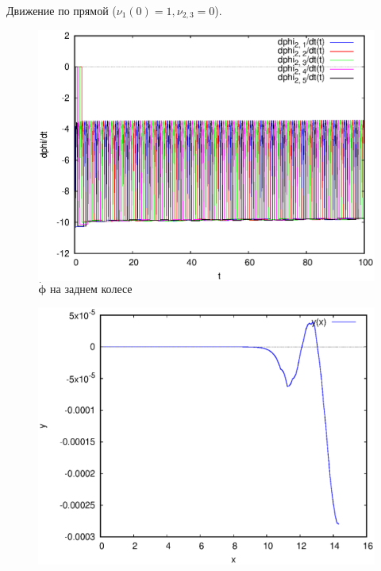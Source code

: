 \documentclass{beamer}
\begin{document}
\begin{frame}{Движение по прямой ($\nu_1(0) = 1, \nu_{2,3} = 0$).}
\begin{figure}[H]
\begin{columns}
                \centering
                \includegraphics[width=\linewidth]{pic/straight_100/nus2.eps}
                \vspace{-15pt}
                \caption{$\dot{\mathbf{\phi}}$ на заднем колесе}
        \end{columns}
    \end{figure}
    \vspace{-25pt}
    \begin{figure}[H]
        \centering
        \begin{columns}
                \centering
                \includegraphics[width=\linewidth]{pic/straight_100/traj.eps}
                \vspace{-15pt}

\end{columns}
\end{figure}
\end{frame}
\end{document}
